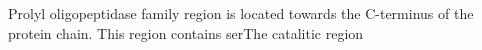 Prolyl oligopeptidase family region is located towards the C-terminus of the protein chain. This region contains serThe catalitic region 